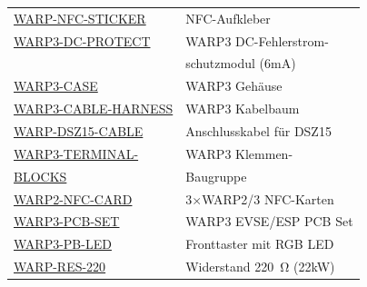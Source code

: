 \documentclass[a4paper,10pt]{article}
\begin{document}
\begin{multicols*}{2}
\begin{tabular}{ll}
        \cmidrule(lr{0.5em}){1-2}
        \href{https://www.tinkerforge.com/de/shop/warp/warp3-spare-parts/warp-nfc-sticker.html}{WARP-NFC-STICKER}                   & NFC-Aufkleber                        \\
        \cmidrule(lr{0.5em}){1-2}
        \href{https://www.tinkerforge.com/de/shop/warp/warp3-spare-parts/warp3-dc-protect.html}{WARP3-DC-PROTECT}					& WARP3 DC-Fehlerstrom-                      \\
                                                                                                                                    & schutzmodul (6mA)                    \\
        \cmidrule(lr{0.5em}){1-2}
        \href{https://www.tinkerforge.com/de/shop/warp/warp3-spare-parts.html}{WARP3-CASE}											& WARP3 Gehäuse                        \\
        \cmidrule(lr{0.5em}){1-2}
        \small{\href{https://www.tinkerforge.com/de/shop/warp/warp3-spare-parts/warp3-cable-harness.html}{WARP3-CABLE-HARNESS}}		& WARP3 Kabelbaum                      \\
        \cmidrule(lr{0.5em}){1-2}
        \small{\href{https://www.tinkerforge.com/de/shop/warp/warp3-spare-parts/warp3-cable-harness.html}{WARP-DSZ15-CABLE}}		& Anschlusskabel für DSZ15                      \\
        \cmidrule(lr{0.5em}){1-2}
        \href{https://www.tinkerforge.com/de/shop/warp/warp3-spare-parts/warp3-terminal-blocks.html}{WARP3-TERMINAL-}				& WARP3 Klemmen-                       \\
        \href{https://www.tinkerforge.com/de/shop/warp/warp3-spare-parts/warp3-terminal-blocks.html}{BLOCKS}                        & Baugruppe                            \\
        \cmidrule(lr{0.5em}){1-2}
        \href{https://www.tinkerforge.com/de/shop/warp/warp3-spare-parts/warp2-nfc-karte.html}{WARP2-NFC-CARD}						& 3$\times$WARP2/3 NFC-Karten            \\
        \cmidrule(lr{0.5em}){1-2}
        \href{https://www.tinkerforge.com/de/shop/warp/warp3-spare-parts/warp3-pcb-set.html}{WARP3-PCB-SET}							& WARP3 EVSE/ESP PCB Set\\
        \cmidrule(lr{0.5em}){1-2}
        \href{https://www.tinkerforge.com/de/shop/warp/warp3-spare-parts/warp3-pb-led-set.html}{WARP3-PB-LED}						& Fronttaster mit RGB LED                     \\
        \cmidrule(lr{0.5em}){1-2}
        \href{https://www.tinkerforge.com/de/shop/warp/warp3-spare-parts/warp-res-220.html}{WARP-RES-220}							& Widerstand \SI{220}{\ohm} (22kW)           \\

\end{tabular}
\end{multicols*}
\end{document}
